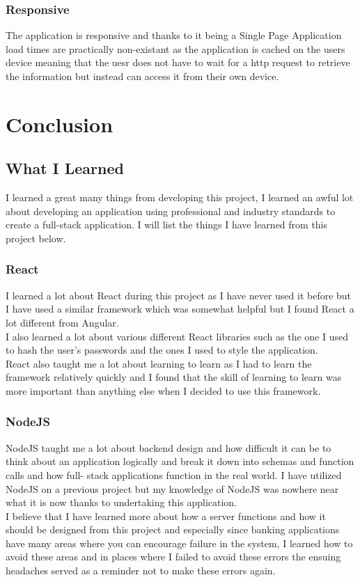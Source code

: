 \subsection{Responsive}
The application is responsive and thanks to it being a Single Page Application load times are
practically non-existant as the application is cached on the users device meaning that the
uesr does not have to wait for a http request to retrieve the information but instead can access
it from their own device.

\chapter{Conclusion}
\section{What I Learned}
I learned a great many things from developing this project, I learned an awful lot about developing an application using professional and industry standards to create a full-stack application.  I will list the things I have learned from this project below.
\subsection{React}
I learned a lot about React during this project as I have never used it before but I
have used a similar framework which was somewhat helpful but I found React a lot different
from Angular.
\\
I also learned a lot about various different React libraries such as the one I used to
hash the user's passwords and the ones I used to style the application.
\\
React also taught me a lot about learning to learn as I had to learn the framework
relatively quickly and I found that the skill of learning to learn was more important
than anything else when I decided to use this framework.
\subsection{NodeJS}
NodeJS taught me a lot about backend design and how difficult it can be to think about
an application logically and break it down into schemas and function calls and how full-
stack applications function in the real world.  I have utilized NodeJS on a previous project
but my knowledge of NodeJS was nowhere near what it is now thanks to undertaking this application.
\\
I believe that I have learned more about how a server functions and how it should be designed from this
project and especially since banking applications have many areas where you can encourage failure in the
system, I learned how to avoid these areas and in places where I failed to avoid these errors the ensuing
headaches served as a reminder not to make these errors again.
